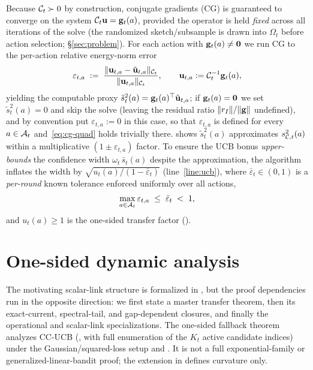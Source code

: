 Because $\mathcal{C}_t\succ 0$ by construction, conjugate gradients (CG) is guaranteed
to converge on the system $\mathcal{C}_t\mathbf{u}=\mathbf{g}_t(a)$, provided the operator is held
\emph{fixed} across all iterations of the solve (the randomized sketch/subsample
is drawn into $\Omega_t$ before action selection; \S\ref{sec:problem}).  For each
action with $\mathbf{g}_t(a)\ne\mathbf0$ we run CG to the per-action relative
energy-norm error
\begin{equation}\label{eq:cg-err-eta}
  \varepsilon_{t,a}
  \;:=\;
  \frac{\|\mathbf{u}_{t,a}-\tilde{\mathbf{u}}_{t,a}\|_{\mathcal{C}_t}}{\|\mathbf{u}_{t,a}\|_{\mathcal{C}_t}},
  \qquad
  \mathbf{u}_{t,a}:=\mathcal{C}_t^{-1}\mathbf{g}_t(a),
\end{equation}
yielding the computable proxy $\tilde{s}_t^2(a)=\mathbf{g}_t(a)^\top\tilde{\mathbf{u}}_{t,a}$;
if $\mathbf{g}_t(a)=\mathbf0$ we set $\tilde{s}_t^2(a)=0$ and skip the solve (leaving the
residual ratio $\|r_I\|/\|\mathbf{g}\|$ undefined), and by convention put
$\varepsilon_{t,a}:=0$ in this case, so that $\varepsilon_{t,a}$ is defined for
every $a\in\mathcal{A}_t$ and~\eqref{eq:cg-quad} holds trivially there.
 shows $\tilde{s}_t^2(a)$ approximates $s_{\mathcal{C},t}^2(a)$ within a
multiplicative $(1\pm\varepsilon_{t,a})$ factor.  To ensure the UCB bonus
\emph{upper-bounds} the confidence width $\omega_t\,\bar s_t(a)$ despite the
approximation, the algorithm inflates the width by
$\sqrt{u_t(a)/(1-\bar\varepsilon_t)}$ (line~\ref{line:ucb}), where
$\bar\varepsilon_t\in(0,1)$ is a \emph{per-round} known tolerance enforced
uniformly over all actions,
\begin{equation}\label{eq:cg-tol-uniform}
  \max_{a\in\mathcal{A}_t}\varepsilon_{t,a}
  \;\le\;\bar\varepsilon_t\;<\;1,
\end{equation}
and $u_t(a)\ge1$ is the one-sided transfer factor ().

\section{One-sided dynamic analysis}\label{sec:theory}

The motivating scalar-link structure is formalized in
, but the proof dependencies run in the opposite
direction: we first state a master transfer theorem, then its exact-current,
spectral-tail, and gap-dependent closures, and finally the operational and
scalar-link specializations.  The one-sided fallback theorem analyzes CC-UCB
(, with full enumeration of the $K_t$ active candidate indices)
under the
Gaussian/squared-loss setup and
.  It is not a
full exponential-family or generalized-linear-bandit proof; the extension in
 defines curvature only.

